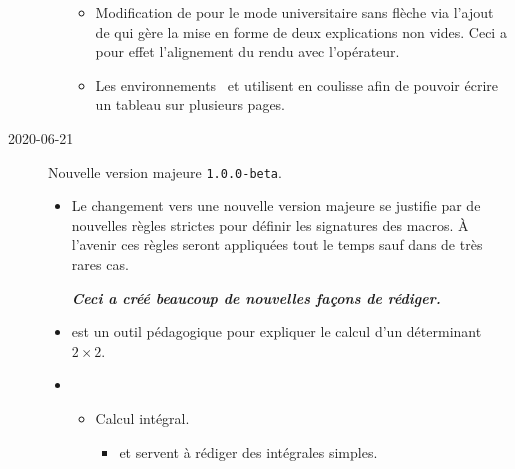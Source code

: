 \documentclass[12pt,a4paper]{article}
\begin{document}
\begin{description}
\begin{itemize}[itemsep=.5em]
\begin{itemize}[itemsep=.5em]
    
            \item Modification de  pour le mode universitaire sans flèche via l'ajout de  qui gère la mise en forme de deux explications non vides.
                  Ceci a pour effet l'alignement du rendu avec l'opérateur.
    
    
            \item Les environnements  et  utilisent  en coulisse afin de pouvoir écrire un tableau sur plusieurs pages.
        \end{itemize}
    \end{itemize}


    \medskip
    \item[2020-06-21] Nouvelle version majeure \verb+1.0.0-beta+.
    
    \begin{itemize}[itemsep=.5em]
        \item Le changement vers une nouvelle version majeure se justifie par de nouvelles règles strictes pour définir les signatures des macros. À l'avenir ces règles seront appliquées tout le temps sauf dans de très rares cas.
        \begin{center}
    		\bfseries\itshape
    		Ceci a créé beaucoup de nouvelles façons de rédiger.
        \end{center}
    
    
    
    
    
        \separation
        \item {}
               est un outil pédagogique pour expliquer le calcul d'un déterminant $2\times2$.
    
    
    
    
        \separation
        \item {}
        \begin{itemize}[itemsep=.5em]
            \item Calcul intégral.
            
            \begin{itemize}[itemsep=.5em, label=$\rightarrow$]
                \item {} et  servent à rédiger des intégrales simples.
    

\end{itemize}
\end{itemize}
\end{itemize}
\end{description}
\end{document}
